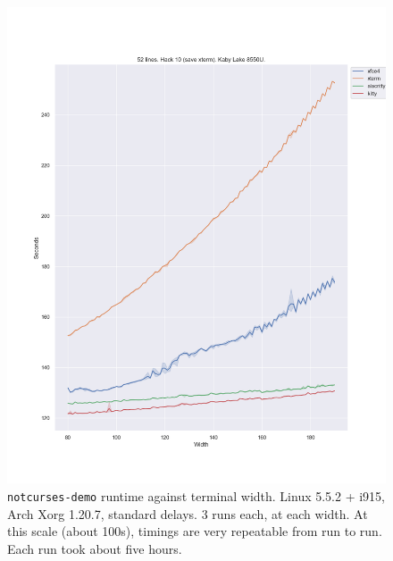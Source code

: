 \begin{figure}[!htb]
\centering
\includegraphics[width=1\textwidth]{media/termsdemo.png}
\caption[Intel i7-8550U benchmarks, varying widths.]{\texttt{notcurses-demo} runtime against terminal width. Linux 5.5.2 + i915, Arch Xorg 1.20.7, standard delays. 3 runs each, at each width.
At this scale (about 100s), timings are very repeatable from run to run. Each run took about five hours.}
\label{fig:intel-full}
\end{figure}

